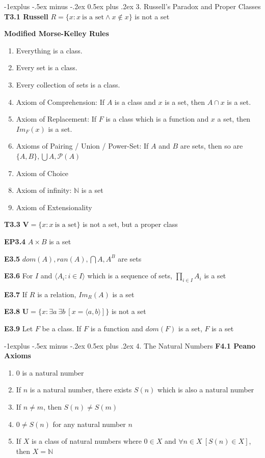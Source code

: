 \documentclass[10pt, landscape]{article}
\makeatletter
\renewcommand{\section}{\@startsection{section}{1}{0mm}%
                                {-1ex plus -.5ex minus -.2ex}%
                                {0.5ex plus .2ex}%
                                {\normalfont\large\bfseries}}
\renewcommand{\section}{\@startsection{section}{2}{0mm}%
                                {-1explus -.5ex minus -.2ex}%
                                {0.5ex plus .2ex}%
                                {\normalfont\normalsize\bfseries}}
\makeatother
\begin{document}
\begin{multicols*}{3}
\section{3. Russell's Paradox and Proper Classes}
\textbf{T3.1 Russell} $R=\{x:x \ \text{is a set} \land x \notin x\}$ is not a set

\textbf{Modified Morse-Kelley Rules}
\begin{enumerate}
    \item Everything is a class.
    \item Every set is a class.
    \item Every collection of sets is a class.
    \item Axiom of Comprehension: If $A$ is a class and $x$ is a set, then $A \cap x$ is a set.
    \item Axiom of Replacement: If $F$ is a class which is a function and $x$ a set, then $Im_F(x)$ is a set.
    \item Axioms of Pairing / Union / Power-Set: If $A$ and $B$ are sets, then so are $\{A,B\}, \bigcup A, \mathcal{P}(A)$
    \item Axiom of Choice
    \item Axiom of infinity: $\mathbb{N}$ is a set
    \item Axiom of Extensionality
\end{enumerate}

\textbf{T3.3} $\mathbf{V}=\{x:x\ \text{is a set}\}$ is not a set, but a proper class

\textbf{EP3.4} $A \times B$ is a set

\textbf{E3.5} $dom(A), ran(A), \bigcap A, A^B$ are sets

\textbf{E3.6} For $I$ and $\langle A_i: i \in I \rangle$ which is a sequence of sets, $\prod_{i \in I} A_i$ is a set

\textbf{E3.7} If $R$ is a relation, $Im_R(A)$ is a set

\textbf{E3.8} $\mathbf{U}=\{x:\exists a \ \exists b \ [x=\langle a, b\rangle]\}$ is not a set

\textbf{E3.9} Let $F$ be a class. If $F$ is a function and $dom(F)$ is a set, $F$ is a set

\section{4. The Natural Numbers}
\textbf{F4.1 Peano Axioms}
\begin{enumerate}
    \item $0$ is a natural number
    \item If $n$ is a natural number, there exists $S(n)$ which is also a natural number
    \item If $n \neq m$, then $S(n)\neq S(m)$
    \item $0 \neq S(n)$ for any natural number $n$
    \item If $X$ is a class of natural numbers where $0 \in X$ and $\forall n \in X \ [S(n) \in X]$, then $X = \mathbb{N}$
\end{enumerate}


\end{multicols*}
\end{document}
